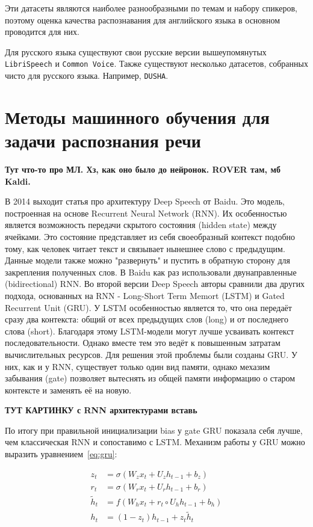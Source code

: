 Эти датасеты являются наиболее разнообразными по темам и набору спикеров, поэтому оценка качества распознавания для английского языка в основном проводится для них.

Для русского языка существуют свои русские версии вышеупомянутых \texttt{LibriSpeech} и \texttt{Common Voice}.
Также существуют несколько датасетов, собранных чисто для русского языка. 
Например, \texttt{DUSHA}.

\section{Методы машинного обучения для задачи распознания речи}

\textbf{Тут что-то про МЛ. Хз, как оно было до нейронок. ROVER там, мб Kaldi.}

В 2014 выходит статья про архитектуру Deep Speech от Baidu. 
Это модель, построенная на основе Recurrent Neural Network (RNN).
Их особенностью является возможность передачи скрытого состояния (hidden state) между ячейками.
Это состояние представляет из себя своеобразный контекст подобно тому, как человек читает текст и связывает нынешнее слово с предыдущим.
Данные модели также можно "развернуть" и пустить в обратную сторону для закрепления полученных слов.
В Baidu как раз использовали двунаправленные (bidirectional) RNN.
Во второй версии Deep Speech авторы сравнили два других подхода, основанных на RNN - Long-Short Term Memort (LSTM) и Gated Recurrent Unit (GRU).
У LSTM особенностью является то, что она передаёт сразу два контекста: общий от всех предыдущих слов (long) и от последнего слова (short).
Благодаря этому LSTM-модели могут лучше усваивать контекст последовательности.
Однако вместе тем это ведёт к повышенным затратам вычислительных ресурсов.
Для решения этой проблемы были созданы GRU.
У них, как и у RNN, существует только один вид памяти, однако мехазим забывания (gate) позволяет вытеснять из общей памяти информацию о старом контексте и заменять её на новую.


\textbf{ТУТ КАРТИНКУ с RNN архитектурами вставь}

По итогу при правильной инициализации bias у gate GRU показала себя лучше, чем классическая RNN и сопоставимо с LSTM.
Механизм работы у GRU можно выразить уравнением~\ref{eq:gru}:

\begin{equation}
  \begin{aligned}
    z_t &= \sigma(W_z x_t + U_z h_{t-1} + b_z) \\
    r_t &= \sigma(W_r x_t + U_r h_{t-1} + b_r) \\
    \tilde{h}_t &= f(W_h x_t + r_t \circ U_h h_{t-1} + b_h) \\
    h_t &= (1 - z_t) h_{t-1} + z_t \tilde{h}_t
  \end{aligned}
  \label{eq:gru}
\end{equation}

